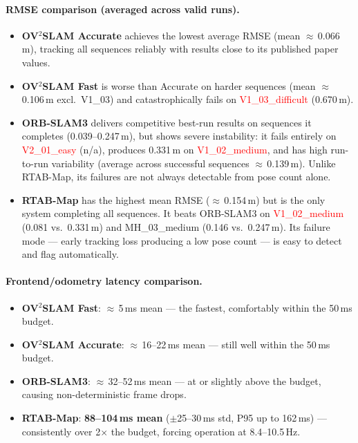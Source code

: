 \documentclass[11pt]{article}
\begin{document}
\paragraph{RMSE comparison (averaged across valid runs).}
\begin{itemize}
    \item \textbf{OV$^2$SLAM Accurate} achieves the lowest average RMSE (mean $\approx$\,0.066\,m), tracking all sequences reliably with results close to its published paper values.
    \item \textbf{OV$^2$SLAM Fast} is worse than Accurate on harder sequences (mean $\approx$\,0.106\,m excl.\ V1\_03) and catastrophically fails on \textcolor{red}{V1\_03\_difficult} (0.670\,m).
    \item \textbf{ORB-SLAM3} delivers competitive best-run results on sequences it completes (0.039--0.247\,m), but shows severe instability: it fails entirely on \textcolor{red}{V2\_01\_easy} (n/a), produces 0.331\,m on \textcolor{red}{V1\_02\_medium}, and has high run-to-run variability (average across successful sequences $\approx$\,0.139\,m). Unlike RTAB-Map, its failures are not always detectable from pose count alone.
    \item \textbf{RTAB-Map} has the highest mean RMSE ($\approx$\,0.154\,m) but is the only system completing all sequences. It beats ORB-SLAM3 on \textcolor{red}{V1\_02\_medium} (0.081 vs.\ 0.331\,m) and MH\_03\_medium (0.146 vs.\ 0.247\,m). Its failure mode — early tracking loss producing a low pose count — is easy to detect and flag automatically.
\end{itemize}

\paragraph{Frontend/odometry latency comparison.}
\begin{itemize}
    \item \textbf{OV$^2$SLAM Fast}: $\approx$\,5\,ms mean — the fastest, comfortably within the 50\,ms budget.
    \item \textbf{OV$^2$SLAM Accurate}: $\approx$\,16--22\,ms mean — still well within the 50\,ms budget.
    \item \textbf{ORB-SLAM3}: $\approx$\,32--52\,ms mean — at or slightly above the budget, causing non-deterministic frame drops.
    \item \textbf{RTAB-Map}: \textbf{88--104\,ms mean} ($\pm$25--30\,ms std, P95 up to 162\,ms) — consistently over 2$\times$ the budget, forcing operation at 8.4--10.5\,Hz.
\end{itemize}
\end{document}

